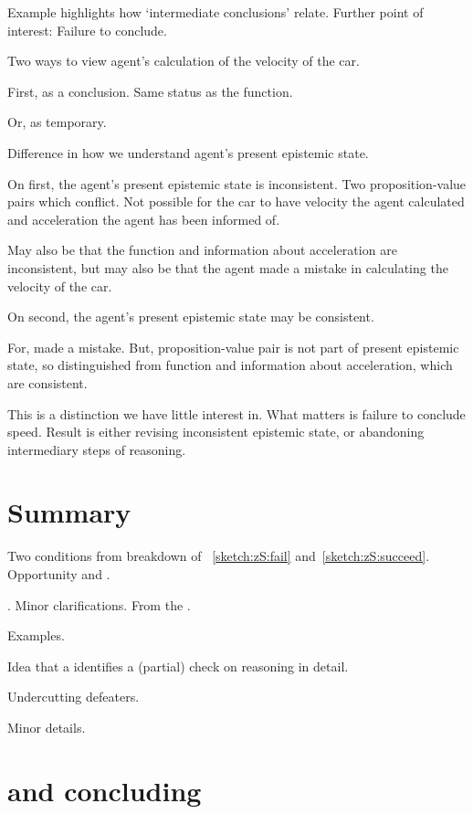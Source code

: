 \begin{note}
  Example highlights how `intermediate conclusions' relate.
  Further point of interest:
  Failure to conclude.

  Two ways to view agent's calculation of the velocity of the car.

  First, as a conclusion.
  Same status as the function.

  Or, as temporary.

  Difference in how we understand agent's present epistemic state.

  On first, the agent's present epistemic state is inconsistent.
  Two proposition-value pairs which conflict.
  Not possible for the car to have velocity the agent calculated and acceleration the agent has been informed of.

  May also be that the function and information about acceleration are inconsistent, but may also be that the agent made a mistake in calculating the velocity of the car.

  On second, the agent's present epistemic state may be consistent.

  For, made a mistake.
  But, proposition-value pair is not part of present epistemic state, so distinguished from function and information about acceleration, which are consistent.

  This is a distinction we have little interest in.
  What matters is failure to conclude speed.
  Result is either revising inconsistent epistemic state, or abandoning intermediary steps of reasoning.
\end{note}

\section{Summary}
\label{cha:zS:sec:curbs:summary}

\begin{note}
  Two conditions from breakdown of ~\ref{sketch:zS:fail} and~\ref{sketch:zS:succeed}.
  Opportunity and \check{}.

  \curb{}.
  Minor clarifications.
  From the \agpe{}.

  Examples.

  Idea that a \curb{} identifies a (partial) check on reasoning in detail.

  Undercutting defeaters.

  Minor details.
\end{note}

\section{ and concluding}
\label{cha:zS:sec:question}

